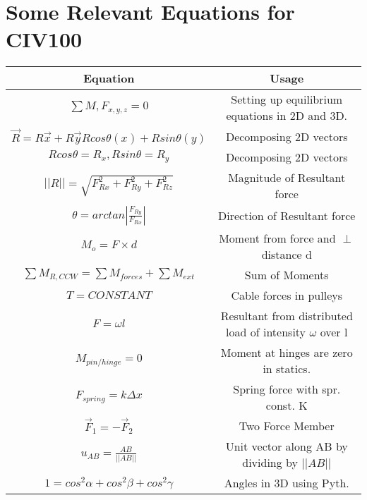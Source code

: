 \documentclass[12pt]{article}
\begin{document}
    \section*{Some Relevant Equations for CIV100}

    \begin{table}[h!]
        \begin{center}
            \begin{tabular}{|c | c |}
            \hline
            \textbf{Equation} & \textbf{Usage}  \\
            \hline
            $\sum M,F_{x,y,z} = 0$ & Setting up equilibrium equations in 2D and 3D. \\\hline
            $\vec R  = R\vec x + R \vec y R cos \theta (x) + R sin\theta (y)$ & Decomposing 2D vectors \\\hline
            $R cos \theta  = R_x, R sin\theta  = R_y$ &  Decomposing 2D vectors \\\hline
            $||R|| = \sqrt{F_{Rx}^2 + F_{Ry}^2 + F_{Rz}^2}$ & Magnitude of Resultant force \\\hline
            $\theta = arctan |\frac{F_{Ry}}{F_{Rx}}| $ & Direction of Resultant force \\\hline
            $M_o = F \times d$ & Moment from force and $\perp$ distance d \\\hline
            $\sum M_{R,CCW} = \sum M_{forces} + \sum M_{ext}$ & Sum of Moments \\\hline
            $T = CONSTANT$ & Cable forces in pulleys\\\hline
            $F = \omega l$ & Resultant from distributed load of intensity $\omega$ over l\\\hline

            $M_{pin/hinge} = 0$ & Moment at hinges are zero in statics.\\\hline

            $F_{spring} = k\Delta x$ & Spring force with spr. const. K \\\hline

            $\vec F_1 = -\vec F_2$ & Two Force Member\\\hline

            $u_{AB} = \frac{AB}{||AB||}$ & Unit vector along AB by dividing by $||AB||$\\\hline

            $1 = cos^2\alpha + cos^2\beta + cos^2 \gamma$ & Angles in 3D using Pyth. \\\hline


\end{tabular}
\end{center}
\end{table}
\end{document}
